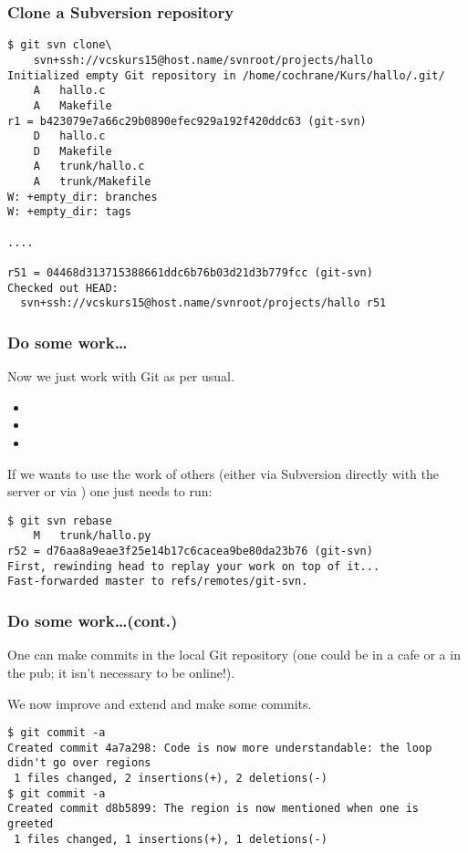\begin{frame}[fragile]
\frametitle{Clone a Subversion repository}
\begin{lstlisting}
$ git svn clone\
    svn+ssh://vcskurs15@host.name/svnroot/projects/hallo
Initialized empty Git repository in /home/cochrane/Kurs/hallo/.git/
    A   hallo.c
    A   Makefile
r1 = b423079e7a66c29b0890efec929a192f420ddc63 (git-svn)
    D   hallo.c
    D   Makefile
    A   trunk/hallo.c
    A   trunk/Makefile
W: +empty_dir: branches
W: +empty_dir: tags

....

r51 = 04468d313715388661ddc6b76b03d21d3b779fcc (git-svn)
Checked out HEAD:
  svn+ssh://vcskurs15@host.name/svnroot/projects/hallo r51
\end{lstlisting}
\end{frame}

\begin{frame}[fragile]
\frametitle{Do some work\ldots}
Now we just work with Git as per usual.
\begin{itemize}
\item {}
\item {}
\item {}
\end{itemize}

If we wants to use the work of others (either via Subversion directly with
the server or via \ttt{git-svn}) one just needs to run: 

\begin{lstlisting}
$ git svn rebase
    M   trunk/hallo.py
r52 = d76aa8a9eae3f25e14b17c6cacea9be80da23b76 (git-svn)
First, rewinding head to replay your work on top of it...
Fast-forwarded master to refs/remotes/git-svn.
\end{lstlisting}
\end{frame}

\begin{frame}[fragile]
\frametitle{Do some work\ldots (cont.)}

One can make commits in the local Git repository (one could be in a cafe or
a in the pub; it isn't necessary to be online!).

We now improve and extend  and make some commits.
\begin{lstlisting}
$ git commit -a
Created commit 4a7a298: Code is now more understandable: the loop didn't go over regions
 1 files changed, 2 insertions(+), 2 deletions(-)
$ git commit -a
Created commit d8b5899: The region is now mentioned when one is greeted
 1 files changed, 1 insertions(+), 1 deletions(-)
\end{lstlisting}
\end{frame}

